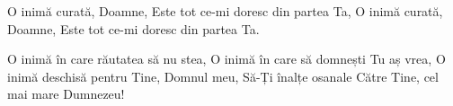 \beginverse
O inimă curată, Doamne,
Este tot ce-mi doresc din partea Ta,
O inimă curată, Doamne,
Este tot ce-mi doresc din partea Ta.
\endverse

\beginchorus
O inimă în care răutatea să nu stea,
O inimă în care să domnești Tu aș vrea,
O inimă deschisă pentru Tine, Domnul meu,
Să-Ți înalțe osanale
Către Tine, cel mai mare Dumnezeu!
\endchorus
\endsong